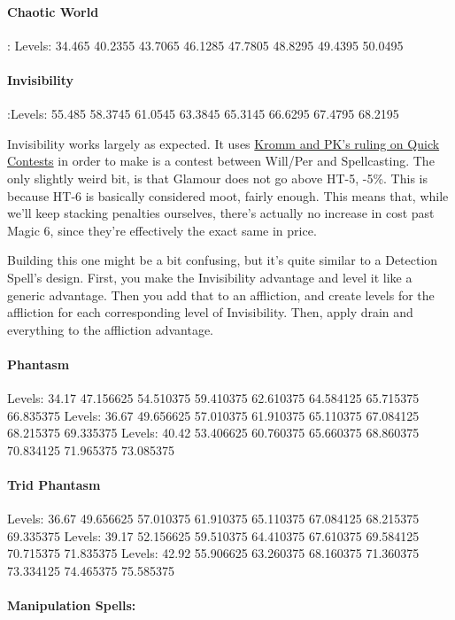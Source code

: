 \begin{multicols*}{2}
	\paragraph{Chaotic World}: Levels: 34.465 40.2355 43.7065 46.1285 47.7805 48.8295 49.4395 50.0495
	
	\paragraph{Invisibility}:Levels: 55.485 58.3745 61.0545 63.3845 65.3145 66.6295 67.4795 68.2195
	
	Invisibility works largely as expected. It uses \href{http://forums.sjgames.com/showpost.php?p=669736&postcount=2}{Kromm and PK's ruling on Quick Contests} in order to make is a contest between Will/Per and Spellcasting. The only slightly weird bit, is that Glamour does not go above HT-5, -5\%. This is because HT-6 is basically considered moot, fairly enough. This means that, while we'll keep stacking penalties ourselves, there's actually no increase in cost past Magic 6, since they're effectively the exact same in price.
	
	Building this one might be a bit confusing, but it's quite similar to  a Detection Spell's design. First, you make the Invisibility advantage and level it like a generic advantage. Then you add that to an affliction, and create levels for the affliction for each corresponding level of Invisibility. Then, apply drain and everything to the affliction advantage.
	
	\paragraph{Phantasm}
	Levels: 34.17 47.156625 54.510375 59.410375 62.610375 64.584125 65.715375 66.835375
	Levels: 36.67 49.656625 57.010375 61.910375 65.110375 67.084125 68.215375 69.335375
	Levels: 40.42 53.406625 60.760375 65.660375 68.860375 70.834125 71.965375 73.085375
	
	\paragraph{Trid Phantasm}
	Levels: 36.67 49.656625 57.010375 61.910375 65.110375 67.084125 68.215375 69.335375
	Levels: 39.17 52.156625 59.510375 64.410375 67.610375 69.584125 70.715375 71.835375
	Levels: 42.92 55.906625 63.260375 68.160375 71.360375 73.334125 74.465375 75.585375
	
	\paragraph{Manipulation Spells:}
	

\end{multicols*}
